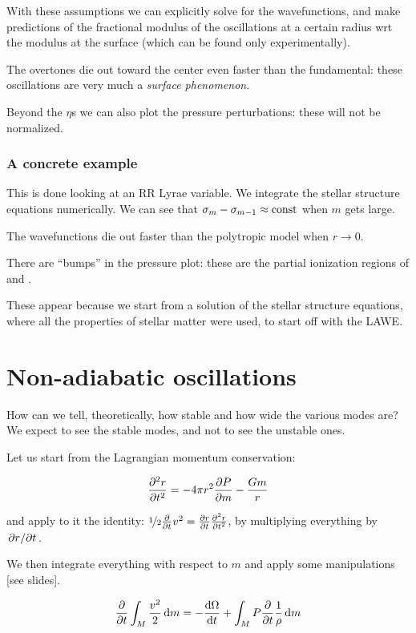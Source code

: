\documentclass[main.tex]{subfiles}
\begin{document}
With these assumptions we can explicitly solve for the wavefunctions, and make predictions of the fractional modulus of the oscillations at a certain radius wrt the modulus at the surface (which can be found only experimentally).

The overtones die out toward the center even faster than the fundamental: these oscillations are very much a \emph{surface phenomenon}.

Beyond the \(\eta\)s we can also plot the pressure perturbations: these will not be normalized.

\subsubsection{A concrete example}

This is done looking at an RR Lyrae variable.
We integrate the stellar structure equations numerically.
We can see that \(\sigma_m - \sigma_{m-1} \approx \text{const}\) when \(m\) gets large.

The wavefunctions die out faster than the polytropic model when \(r \rightarrow 0\).

There are ``bumps'' in the pressure plot: these are the partial ionization regions of  and .

These appear because we start from a solution of the stellar structure equations, where all the properties of stellar matter were used, to start off with the LAWE.

\section{Non-adiabatic oscillations}

How can we tell, theoretically, how stable and how wide the various modes are?
We expect to see the stable modes, and not to see the unstable ones.

Let us start from the Lagrangian momentum conservation:

\begin{equation}
    \pdv[2]{r}{t} = - 4 \pi r^2 \pdv{P}{m} - \frac{Gm}{r}
\end{equation}

and apply to it the identity: \(\frac[i]{1}{2} \pdv{}{t} v^2 = \pdv{r}{t} \pdv[2]{r}{t}\), by multiplying everything by \(\pdv*{r}{t} \).

We then integrate everything with respect to \(m\) and apply some manipulations [see slides].

\begin{equation}
  \pdv{}{t} \int_M \frac{v^2}{2} \dd{m} =
  - \dv{\Omega}{t} + \int_M P \pdv{}{t} \frac{1}{\rho} \dd{m}
\end{equation}
\end{document}
